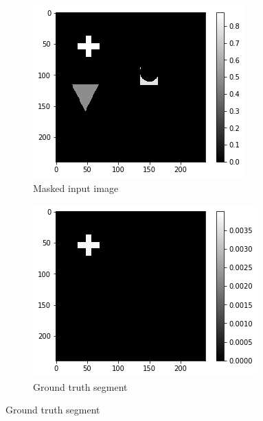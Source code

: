 \begin{figure}[H]
    \centering
    \begin{subfigure}[t]{.30\textwidth}
        \centering
        \includegraphics[width=\linewidth]{chapters/06_hdm/visualization/masked.png}
        \caption{Masked input image}
    \end{subfigure}\hfill%
    \begin{subfigure}[t]{.32\textwidth}
        \centering
        \includegraphics[width=\linewidth]{chapters/06_hdm/visualization/ground_truth.png}
        \caption{Ground truth segment}
    \end{subfigure}\hfill%

\end{figure}
